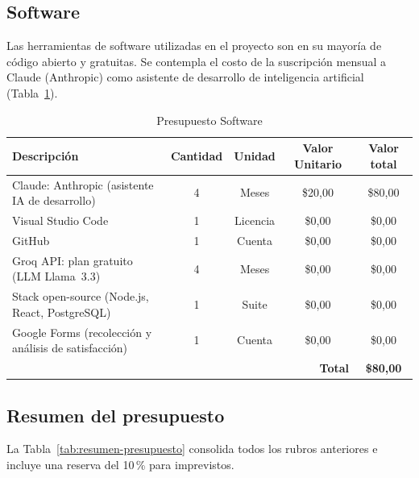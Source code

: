 \subsection{Software}

Las herramientas de software utilizadas en el proyecto son en su mayoría de código abierto y gratuitas. Se contempla el costo de la suscripción mensual a Claude (Anthropic) como asistente de desarrollo de inteligencia artificial (Tabla~\ref{tab:presupuesto-software}).

\begin{table}[H]
\centering
\caption{Presupuesto Software}
\label{tab:presupuesto-software}
\begin{tabular}{|p{7cm}|c|c|c|c|}
\hline
\rowcolor[HTML]{B6DAF8}
\textbf{Descripción} & \textbf{Cantidad} & \textbf{Unidad} & \textbf{Valor Unitario} & \textbf{Valor total} \\ \hline
Claude: Anthropic (asistente IA de desarrollo)               & 4 & Meses    & \$20,00  & \$80,00  \\ \hline
Visual Studio Code                                              & 1 & Licencia & \$0,00   & \$0,00   \\ \hline
GitHub                                                          & 1 & Cuenta   & \$0,00   & \$0,00   \\ \hline
Groq API: plan gratuito (LLM Llama~3.3)                      & 4 & Meses    & \$0,00   & \$0,00   \\ \hline
Stack open-source (Node.js, React, PostgreSQL)                  & 1 & Suite    & \$0,00   & \$0,00   \\ \hline
Google Forms (recolección y análisis de satisfacción)           & 1 & Cuenta   & \$0,00   & \$0,00   \\ \hline
\multicolumn{4}{|r|}{\textbf{Total}}                          & \textbf{\$80,00}      \\ \hline
\end{tabular}
\end{table}

\subsection{Resumen del presupuesto}

La Tabla~\ref{tab:resumen-presupuesto} consolida todos los rubros anteriores e incluye una reserva del 10\,\% para imprevistos.

